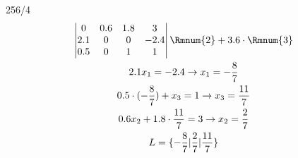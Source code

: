 \begin{exercise}{256/4}
\begin{gather*}
    \begin{vmatrix}
      0 & 0.6 & 1.8 & 3 \\
      2.1 & 0 & 0 & -2.4 \\
      0.5 & 0 & 1 & 1 \\
    \end{vmatrix} \Rmnum{2} + 3.6 \cdot \Rmnum{3} \\
    2.1x_1 = -2.4 \rightarrow x_1 = -\frac{8}{7} \\
    0.5 \cdot (-\frac{8}{7}) + x_3 = 1 \rightarrow x_3 = \frac{11}{7} \\
    0.6x_2 + 1.8 \cdot \frac{11}{7} = 3 \rightarrow x_2 = \frac{2}{7} \\
    L = \{-\frac{8}{7}|\frac{2}{7}|\frac{11}{7}\}
  \end{gather*}
\end{exercise}
